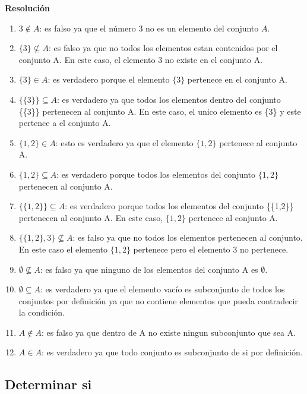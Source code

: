 \documentclass{article}
\begin{document}
\textbf{Resolución}
\begin{enumerate}[label=\roman*)]
    \item $3 \notin A$: es falso ya que el número $3$ no es un elemento del conjunto $A$.
    \item $\{3\} \not\subseteq A$: es falso ya que no todos los elementos estan contenidos por el conjunto A. En este caso, el elemento 3 no existe en el conjunto A.
    \item $\{3\} \in A$: es verdadero porque el elemento $\{3\}$ pertenece en el conjunto A.
    \item $\{\{3\}\} \subseteq A$: es verdadero ya que todos los elementos dentro del conjunto \{\{3\}\} pertenecen al conjunto A. En este caso, el unico elemento es \{3\} y este pertence a el conjunto A. 
    \item $\{1,2\} \in A$: esto es verdadero ya que el elemento $\{1,2\}$ pertenece al conjunto A.
    \item $\{1,2\} \subseteq A$: es verdadero porque todos los elementos del conjunto $\{1,2\}$ pertenecen al conjunto A. 
    \item $\{\{1,2\}\} \subseteq A$: es verdadero porque todos los elementos del conjunto \{\{1,2\}\} pertenecen al conjunto A. En este caso, $\{1,2\}$ pertenece al conjunto A. 
    \item $\{\{1,2\},3\} \not\subseteq A$: es falso ya que no todos los elementos pertenecen al conjunto. En este caso el elemento $\{1,2\}$ pertenece pero el elemento 3 no pertenece.
    \item $\emptyset \not\subseteq A$: es falso ya que ninguno de los elementos del conjunto A es $\emptyset$.
    \item $\emptyset \subseteq A$: es verdadero ya que el elemento vacío es subconjunto de todos los conjuntos por definición ya que no contiene elementos que pueda contradecir la condición.
    \item $A \not\in A$: es falso ya que dentro de A no existe ningun subconjunto que sea A.
    \item $A \in A$: es verdadero ya que todo conjunto es subconjunto de si por definición.
\end{enumerate}

\subsection{Determinar si }
\end{document}
